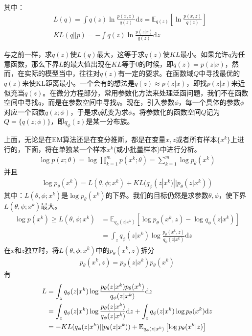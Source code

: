             其中：
            \begin{align*}
            & L(q) = \int q(z) \ln \frac{p(x,z)}{q(z)}\mathrm{d}z = \mathbb{E}_{q(z)} \left[\ln  \frac{p(x,z)}{q(z)}\right]\\
            & KL(q||p) = -\int q(z) \ln \frac{p(z|x)}{q(z)}\mathrm{d}z
            \end{align*}
            \par
            与之前一样，求$q(z)$使$L(q)$最大，这等于求$q(z)$使$KL$最小。如果允许$q$为任意函数，那么下界$L$的最大值出现在$KL$等于0的时候，即$q(z) = p(z|x)$，然而，在实际的模型当中，往往对$q(z)$有一定的要求。在函数域$Q$中寻找最优的$q(z)$来使KL距离最小。一个会有的想法是$q(z)\approx p(z|x)$，即找$p(z|x)$来近似充当$q(z)$。在微分方程部分，常用参数化方法来处理泛函问题，我们不在函数空间中寻找$q$，而是在参数空间中寻找$q$。现在，引入参数$\phi$，每一个具体的参数$\phi$对应一个函数$q(z;\phi)$，于是求$q$就变为求$\phi$。将参数化的函数空间$Q$记为$Q=\{q(z;\phi)\}$，即$q_\phi(z)$是某一分布族。
            \par
            上面，无论是在EM算法还是在变分推断，都是在变量$x,z$或者所有样本$\{x^k\}$上进行的，下面，将在单独某一个样本$x^k$(或小批量样本)中进行分析。
            \begin{align*}
            \log p(x;\theta) = \log \prod_{k=1}^m p(x^k;\theta) =\sum_{k=1}^m\log p_\theta(x^k)
            \end{align*}
            并且
            \begin{align*}
            \log p_\theta(x^k) = L(\theta,\phi;x^k)+KL(q_\phi(z|x^k)||p_\theta(z|x^k))
            \end{align*}
            其中：$L(\theta,\phi;x^k)$是$\log p_\theta(x^k)$的下界。我们的目标仍然是求参数$\theta,\phi$，使下界$L(\theta,\phi;x^k)$最大。
            \begin{align*}
            \log p(x^k) \geqslant L(\theta,\phi;x^k) & = \mathbb{E}_{q_\phi(z|x^k)} \left[\log p_\theta(x^k,z) - \log q_\phi(z|x^k)  \right]\\
            & =\int _z q_\phi(z|x^k) \log \frac{p_\theta(x^k,z)}{q_\phi(z|x^k)}\mathrm{d}z
            \end{align*}
            在$x$和$z$独立时，将$L(\theta,\phi;x^k)$中的$p_\theta(x^k,z)$拆分
            \begin{align*}
            p_\theta(x^k,z) = p_\theta(z|x^k)p_\theta(x^k)
            \end{align*}
            有
            \begin{align}
            \label{VAE的目标L}
            L &= \int _z q_\phi(z|x^k) \log \frac{p_\theta(z|x^k)p_\theta(x^k)}{q_\phi(z|x^k)}\mathrm{d}z\notag \\
            & =\int_z q_\phi(z|x^k) \log \frac{p_\theta(z|x^k)}{q_\phi(z|x^k)}\mathrm{d}z + \int_z q_\phi(z|x^k)\log p_\theta (x^k)\mathrm{d}z\notag \\
            &= -KL(q_\phi(z|x^k)||p_\theta(z|x^k))+\mathbb{E} _{q_\phi(z|x^k)} \left[ \log p_\theta(x^k|z) \right]
            \end{align}
